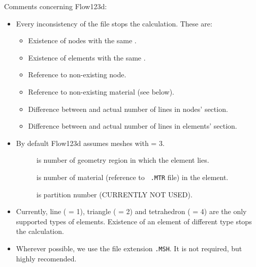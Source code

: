 Comments concerning Flow123d:
\begin{itemize}
  \item Every inconsistency of the file stops the calculation.
    These are:
      \begin{itemize}
        \item Existence of nodes with the same .
        \item Existence of elements with the same .
        \item Reference to non-existing node.
        \item Reference to non-existing material (see below).
        \item Difference between  and actual number of
          lines in nodes' section.
        \item Difference between  and actual number of
          lines in elements' section.
      \end{itemize}
  \item By default Flow123d assumes meshes with  = 3.
    \begin{description}
    \item[] is number of geometry region in which the element lies. 
    \item[] is number of material (reference to {\tt
    .MTR} file) in the element.
    \item[] is partition number (CURRENTLY NOT USED).
    \end{description}
  \item Currently, line ( = 1), triangle ( = 2) and
    tetrahedron ( = 4) are the only supported types
    of elements. Existence of an element of different type stops the calculation.
  \item Wherever possible, we use the file extension {\tt .MSH}. It is not
    required, but highly recomended.
\end{itemize}



